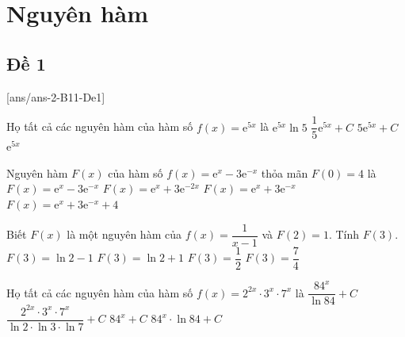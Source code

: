 \section{Nguyên hàm}
\subsection{Đề 1}
[ans/ans-2-B11-De1]
\caulc
\begin{ex}%
	Họ tất cả các nguyên hàm của hàm số $f(x)=\mathrm{e}^{5x}$ là
	\choice
	{$\mathrm{e}^{5x}\ln5$}
	{\True $\dfrac{1}{5} \mathrm{e}^{5x}+C$}
	{$5\mathrm{e}^{5x}+C$}
	{$\mathrm{e}^{5x}$}
\end{ex}
\begin{ex} %
	Nguyên hàm $F(x)$ của hàm số $f(x)= \mathrm{e}^x - 3\mathrm{e}^{-x}$ thỏa mãn $F(0)=4$ là
	\choice
	{$F(x)=\mathrm{e}^x - 3\mathrm{e}^{-x}$}
	{$F(x)=\mathrm{e}^x + 3\mathrm{e}^{-2x}$}
	{\True $F(x)=\mathrm{e}^x + 3\mathrm{e}^{-x}$}
	{$F(x)=\mathrm{e}^x + 3\mathrm{e}^{-x} +4$}

\end{ex}
\begin{ex}%
	Biết $F(x)$ là một nguyên hàm của $f(x)=\dfrac{1}{x-1}$ và $F(2)=1$. Tính $F(3)$.
	\choice
	{$F(3) =\ln 2 - 1$}
	{\True $F(3) =\ln 2 + 1$}
	{$F(3) =\dfrac{1}{2}$}
	{$F(3) =\dfrac{7}{4}$}
\end{ex}


\begin{ex}%
	Họ tất cả các nguyên hàm của hàm số $f(x)=2^{2x}\cdot 3^x\cdot 7^x$ là
	\choice
	{\True $\dfrac{84^x}{\ln 84}+C$}
	{$\dfrac{2^{2x}\cdot 3^x\cdot 7^x}{\ln2\cdot\ln3\cdot\ln7}+C$}
	{$84^x+C$}
	{$84^x\cdot\ln84+C$}
\end{ex}


